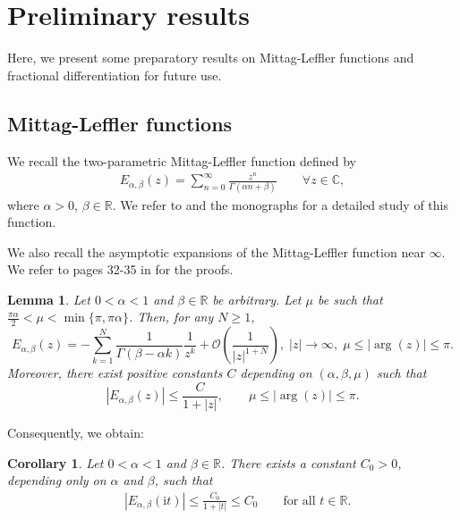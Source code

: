 \documentclass[reqno]{amsart}
\newtheorem{lem}[theorem]{Lemma}
\newtheorem{cor}[theorem]{Corollary}
\numberwithin{equation}{section}
\begin{document}
\section{Preliminary results}\label{sec2}
Here, we present some preparatory results on Mittag-Leffler functions and fractional differentiation for future use.

\subsection{Mittag-Leffler functions}
We recall the two-parametric Mittag-Leffler function defined by
\begin{align*}
    E_{\alpha,\beta}(z)=\sum_{n=0}^{\infty}\frac{z^n}{\Gamma(\alpha n+\beta)} \qquad \forall z\in\mathbb{C},
\end{align*}
where $\alpha>0$, $\beta\in \mathbb{R}$. We refer to \cite{ML03} and the monographs \cite{Gor20, podlubny99} for a detailed study of this function.

We also recall the asymptotic expansions of the Mittag-Leffler function near $\infty$. We refer to pages 32-35 in \cite{podlubny99} for the proofs.
\begin{lem}
Let $0<\alpha<1$ and $\beta \in \mathbb{R}$ be arbitrary. Let $\mu$ be such that $\frac{\pi \alpha}{2}<\mu<\min \{\pi, \pi \alpha\}$. Then, for any $N\ge 1$,
\begin{equation}\label{asymptotic expansions}
    E_{\alpha, \beta}(z)=-\sum_{k=1}^N\frac{1}{\Gamma(\beta-\alpha k)}\frac{1}{z^k} + \mathcal{O}\left(\frac{1}{|z|^{1+N}} \right), \; |z|\to \infty, \; \mu \leq |\arg (z)| \leq \pi.
\end{equation}
Moreover, there exist positive constants $C$ depending on $(\alpha, \beta, \mu)$ such that
\begin{equation}\label{boundedness M-L}
\left|E_{\alpha, \beta}(z)\right| \leq \frac{C}{1+|z|}, \qquad \mu \leq |\arg (z)| \leq \pi.
\end{equation}
\end{lem}
Consequently, we obtain:
\begin{cor}
\label{est12}
Let $0<\alpha<1$ and $\beta\in \mathbb{R}$. There exists a constant $C_0>0$, depending only on $\alpha$ and $\beta$, such that
\begin{align}\label{es0}
& \left|E_{\alpha, \beta}\left(\mathrm{i} t\right)\right| \leq \frac{C_0}{1+|t|} \leq C_0 \qquad \text{for all } t\in \mathbb{R}.
\end{align}
\end{cor}
\end{document}
